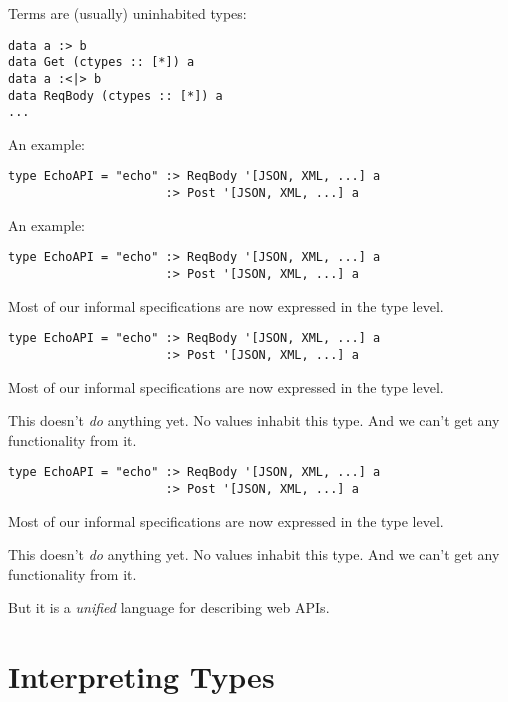 \documentclass{beamer}
\begin{document}
\begin{frame}[fragile]
Terms are (usually) uninhabited types:
    \begin{verbatim}
data a :> b
data Get (ctypes :: [*]) a
data a :<|> b
data ReqBody (ctypes :: [*]) a
...
    \end{verbatim}
\end{frame}

\begin{frame}[fragile]
An example:
\begin{verbatim}
type EchoAPI = "echo" :> ReqBody '[JSON, XML, ...] a
                      :> Post '[JSON, XML, ...] a
\end{verbatim}
\end{frame}

\begin{frame}[fragile]
An example:
\begin{verbatim}
type EchoAPI = "echo" :> ReqBody '[JSON, XML, ...] a
                      :> Post '[JSON, XML, ...] a
\end{verbatim}
Most of our informal specifications are now expressed in the type level.
\end{frame}

\begin{frame}[fragile]
\begin{verbatim}
type EchoAPI = "echo" :> ReqBody '[JSON, XML, ...] a
                      :> Post '[JSON, XML, ...] a
\end{verbatim}
Most of our informal specifications are now expressed in the type level.

This doesn't \textit{do} anything yet. No values inhabit this type. And we
can't get any functionality from it.
\end{frame}

\begin{frame}[fragile]
\begin{verbatim}
type EchoAPI = "echo" :> ReqBody '[JSON, XML, ...] a
                      :> Post '[JSON, XML, ...] a
\end{verbatim}
Most of our informal specifications are now expressed in the type level.

This doesn't \textit{do} anything yet. No values inhabit this type. And we
can't get any functionality from it.

But it is a \textit{unified} language for describing web APIs.
\end{frame}

\section{Interpreting Types}%
\end{document}

